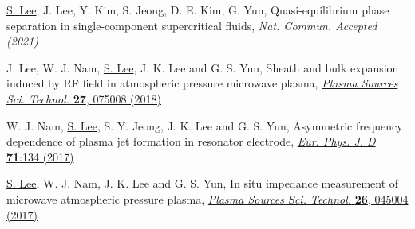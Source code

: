 \begin{publication}
    \item \underline{S. Lee}, J. Lee, Y. Kim, S. Jeong, D. E. Kim, G. Yun, Quasi-equilibrium phase separation in single-component supercritical fluids, \textit{Nat. Commun. Accepted (2021)}
    \item J. Lee, W. J. Nam, \underline{S. Lee}, J. K. Lee and G. S. Yun, Sheath and bulk expansion induced by RF field in atmospheric pressure microwave plasma, \href{https://iopscience.iop.org/article/10.1088/1361-6595/aac14e}{\textit{Plasma Sources Sci. Technol.} \textbf{27}, 075008 (2018)}
    \item W. J. Nam, \underline{S. Lee}, S. Y. Jeong, J. K. Lee and G. S. Yun, Asymmetric frequency dependence of plasma jet formation in resonator electrode, \href{https://link.springer.com/article/10.1140/epjd/e2017-70549-4}{\textit{Eur. Phys. J. D} \textbf{71}:134 (2017)}
    \item \underline{S. Lee}, W. J. Nam, J. K. Lee and G. S. Yun, In situ impedance measurement of microwave atmospheric pressure plasma, \href{https://iopscience.iop.org/article/10.1088/1361-6595/aa5d26}{\textit{Plasma Sources Sci. Technol.} \textbf{26}, 045004 (2017)}
\end{publication}

